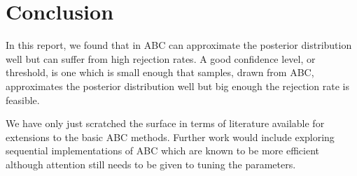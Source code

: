\documentclass[a4paper,10pt]{article}
\begin{document}
\section{Conclusion}
In this report, we found that in ABC can approximate the posterior distribution well but can suffer from high rejection rates. A good confidence level, or threshold, is one which is small enough that samples, drawn from ABC, approximates the posterior distribution well but big enough the rejection rate is feasible.

We have only just scratched the surface in terms of literature available for extensions to the basic ABC methods. Further work would include exploring sequential implementations of ABC which are known to be more efficient although attention still needs to be given to tuning the parameters.





\end{document}
